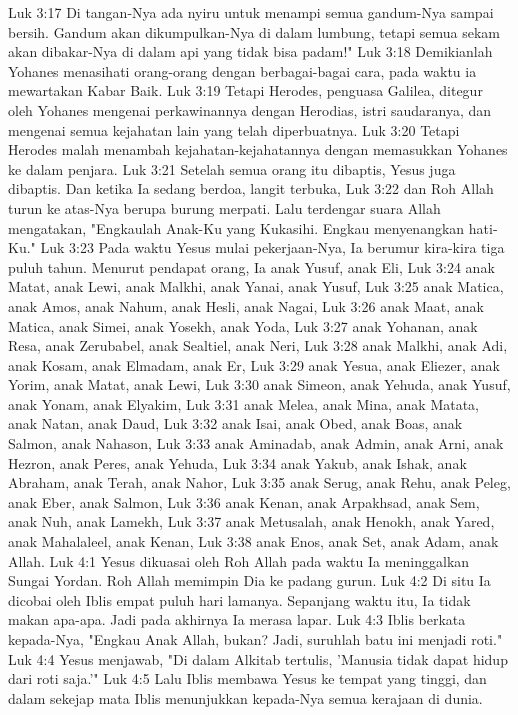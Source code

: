 Luk 3:17  Di tangan-Nya ada nyiru untuk menampi semua gandum-Nya sampai bersih. Gandum akan dikumpulkan-Nya di dalam lumbung, tetapi semua sekam akan dibakar-Nya di dalam api yang tidak bisa padam!"
Luk 3:18  Demikianlah Yohanes menasihati orang-orang dengan berbagai-bagai cara, pada waktu ia mewartakan Kabar Baik.
Luk 3:19  Tetapi Herodes, penguasa Galilea, ditegur oleh Yohanes mengenai perkawinannya dengan Herodias, istri saudaranya, dan mengenai semua kejahatan lain yang telah diperbuatnya.
Luk 3:20  Tetapi Herodes malah menambah kejahatan-kejahatannya dengan memasukkan Yohanes ke dalam penjara.
Luk 3:21  Setelah semua orang itu dibaptis, Yesus juga dibaptis. Dan ketika Ia sedang berdoa, langit terbuka,
Luk 3:22  dan Roh Allah turun ke atas-Nya berupa burung merpati. Lalu terdengar suara Allah mengatakan, "Engkaulah Anak-Ku yang Kukasihi. Engkau menyenangkan hati-Ku."
Luk 3:23  Pada waktu Yesus mulai pekerjaan-Nya, Ia berumur kira-kira tiga puluh tahun. Menurut pendapat orang, Ia anak Yusuf, anak Eli,
Luk 3:24  anak Matat, anak Lewi, anak Malkhi, anak Yanai, anak Yusuf,
Luk 3:25  anak Matica, anak Amos, anak Nahum, anak Hesli, anak Nagai,
Luk 3:26  anak Maat, anak Matica, anak Simei, anak Yosekh, anak Yoda,
Luk 3:27  anak Yohanan, anak Resa, anak Zerubabel, anak Sealtiel, anak Neri,
Luk 3:28  anak Malkhi, anak Adi, anak Kosam, anak Elmadam, anak Er,
Luk 3:29  anak Yesua, anak Eliezer, anak Yorim, anak Matat, anak Lewi,
Luk 3:30  anak Simeon, anak Yehuda, anak Yusuf, anak Yonam, anak Elyakim,
Luk 3:31  anak Melea, anak Mina, anak Matata, anak Natan, anak Daud,
Luk 3:32  anak Isai, anak Obed, anak Boas, anak Salmon, anak Nahason,
Luk 3:33  anak Aminadab, anak Admin, anak Arni, anak Hezron, anak Peres, anak Yehuda,
Luk 3:34  anak Yakub, anak Ishak, anak Abraham, anak Terah, anak Nahor,
Luk 3:35  anak Serug, anak Rehu, anak Peleg, anak Eber, anak Salmon,
Luk 3:36  anak Kenan, anak Arpakhsad, anak Sem, anak Nuh, anak Lamekh,
Luk 3:37  anak Metusalah, anak Henokh, anak Yared, anak Mahalaleel, anak Kenan,
Luk 3:38  anak Enos, anak Set, anak Adam, anak Allah.
Luk 4:1  Yesus dikuasai oleh Roh Allah pada waktu Ia meninggalkan Sungai Yordan. Roh Allah memimpin Dia ke padang gurun.
Luk 4:2  Di situ Ia dicobai oleh Iblis empat puluh hari lamanya. Sepanjang waktu itu, Ia tidak makan apa-apa. Jadi pada akhirnya Ia merasa lapar.
Luk 4:3  Iblis berkata kepada-Nya, "Engkau Anak Allah, bukan? Jadi, suruhlah batu ini menjadi roti."
Luk 4:4  Yesus menjawab, "Di dalam Alkitab tertulis, 'Manusia tidak dapat hidup dari roti saja.'"
Luk 4:5  Lalu Iblis membawa Yesus ke tempat yang tinggi, dan dalam sekejap mata Iblis menunjukkan kepada-Nya semua kerajaan di dunia.
